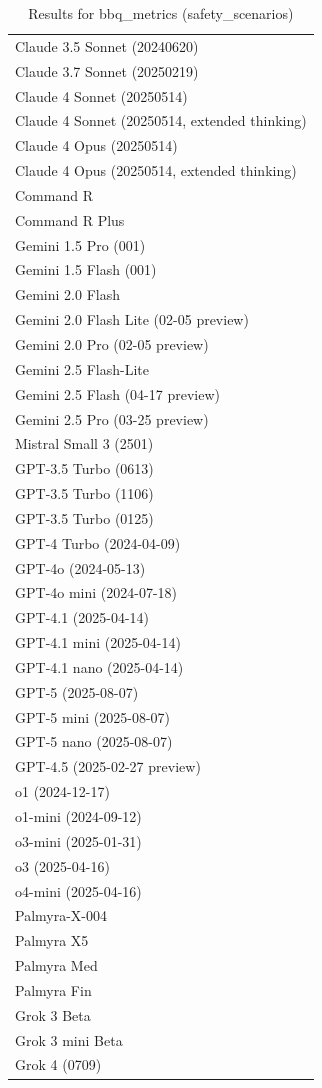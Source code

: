 \begin{table}[htp]
{\begin{tabular}{l}
Claude 3.5 Sonnet (20240620) \\
Claude 3.7 Sonnet (20250219) \\
Claude 4 Sonnet (20250514) \\
Claude 4 Sonnet (20250514, extended thinking) \\
Claude 4 Opus (20250514) \\
Claude 4 Opus (20250514, extended thinking) \\
Command R \\
Command R Plus \\
Gemini 1.5 Pro (001) \\
Gemini 1.5 Flash (001) \\
Gemini 2.0 Flash \\
Gemini 2.0 Flash Lite (02-05 preview) \\
Gemini 2.0 Pro (02-05 preview) \\
Gemini 2.5 Flash-Lite \\
Gemini 2.5 Flash (04-17 preview) \\
Gemini 2.5 Pro (03-25 preview) \\
Mistral Small 3 (2501) \\
GPT-3.5 Turbo (0613) \\
GPT-3.5 Turbo (1106) \\
GPT-3.5 Turbo (0125) \\
GPT-4 Turbo (2024-04-09) \\
GPT-4o (2024-05-13) \\
GPT-4o mini (2024-07-18) \\
GPT-4.1 (2025-04-14) \\
GPT-4.1 mini (2025-04-14) \\
GPT-4.1 nano (2025-04-14) \\
GPT-5 (2025-08-07) \\
GPT-5 mini (2025-08-07) \\
GPT-5 nano (2025-08-07) \\
GPT-4.5 (2025-02-27 preview) \\
o1 (2024-12-17) \\
o1-mini (2024-09-12) \\
o3-mini (2025-01-31) \\
o3 (2025-04-16) \\
o4-mini (2025-04-16) \\
Palmyra-X-004 \\
Palmyra X5 \\
Palmyra Med \\
Palmyra Fin \\
Grok 3 Beta \\
Grok 3 mini Beta \\
Grok 4 (0709) \\
\bottomrule
\end{tabular}}
\caption{Results for bbq_metrics (safety_scenarios)}
\label{fig:bbq_metrics (safety_scenarios)}
\end{table}